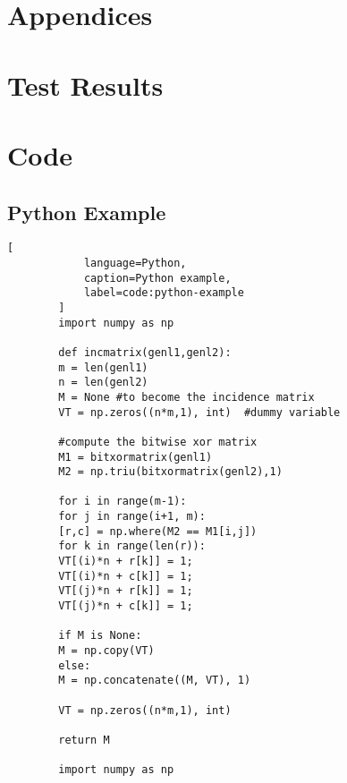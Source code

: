 \begin{appendix}
    \chapter*{Appendices}
    \label{cha:appendices}


    \chapter{Test Results}
    \label{app:test-results}
    

    \chapter{Code}

    \section{Python Example}

    \begin{lstlisting}[
            language=Python,
            caption=Python example,
            label=code:python-example
        ]
        import numpy as np
        
        def incmatrix(genl1,genl2):
        m = len(genl1)
        n = len(genl2)
        M = None #to become the incidence matrix
        VT = np.zeros((n*m,1), int)  #dummy variable
        
        #compute the bitwise xor matrix
        M1 = bitxormatrix(genl1)
        M2 = np.triu(bitxormatrix(genl2),1)
        
        for i in range(m-1):
        for j in range(i+1, m):
        [r,c] = np.where(M2 == M1[i,j])
        for k in range(len(r)):
        VT[(i)*n + r[k]] = 1;
        VT[(i)*n + c[k]] = 1;
        VT[(j)*n + r[k]] = 1;
        VT[(j)*n + c[k]] = 1;
        
        if M is None:
        M = np.copy(VT)
        else:
        M = np.concatenate((M, VT), 1)
        
        VT = np.zeros((n*m,1), int)
        
        return M
        
        import numpy as np
        

\end{lstlisting}
\end{appendix}
